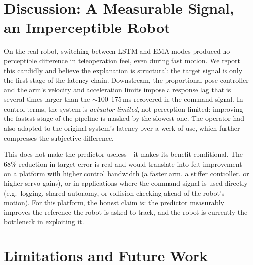 \documentclass[11pt,a4paper]{article}
\begin{document}
\section{Discussion: A Measurable Signal, an Imperceptible Robot}
\label{sec:discussion}

On the real robot, switching between LSTM and EMA modes produced no
perceptible difference in teleoperation feel, even during fast motion. We
report this candidly and believe the explanation is structural: the target
signal is only the first stage of the latency chain. Downstream, the
proportional pose controller and the arm's velocity and acceleration limits
impose a response lag that is several times larger than the $\sim$100--175\,ms
recovered in the command signal. In control terms, the system is
\emph{actuator-limited}, not perception-limited: improving the fastest stage
of the pipeline is masked by the slowest one. The operator had also adapted to
the original system's latency over a week of use, which further compresses the
subjective difference.

This does not make the predictor useless---it makes its benefit conditional.
The 68\% reduction in target error is real and would translate into felt
improvement on a platform with higher control bandwidth (a faster arm, a
stiffer controller, or higher servo gains), or in applications where the
command signal is used directly (e.g.\ logging, shared autonomy, or collision
checking ahead of the robot's motion). For this platform, the honest claim is:
the predictor measurably improves the reference the robot is asked to track,
and the robot is currently the bottleneck in exploiting it.

\section{Limitations and Future Work}
\label{sec:limitations}
\end{document}
